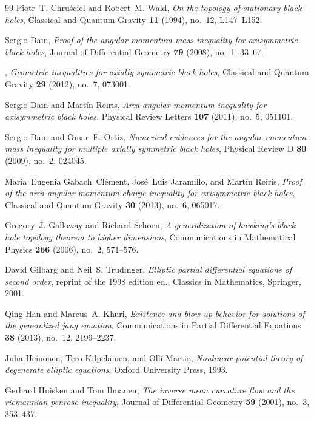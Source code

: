 \begin{thebibliography}{99}
Piotr~T. Chru\'sciel and Robert~M. Wald, \emph{On the topology of stationary black holes}, Classical and Quantum Gravity \textbf{11} (1994), no.~12, L147--L152.

Sergio Dain, \emph{Proof of the angular momentum-mass inequality for
  axisymmetric black holes}, Journal of Differential Geometry \textbf{79}
  (2008), no.~1, 33--67.

\bysame, \emph{Geometric inequalities for axially symmetric black holes},
  Classical and Quantum Gravity \textbf{29} (2012), no.~7, 073001.

Sergio Dain and Mart\'in Reiris, \emph{Area-angular momentum inequality for
  axisymmetric black holes}, Physical Review Letters \textbf{107} (2011),
  no.~5, 051101.

Sergio Dain and Omar~E. Ortiz, \emph{Numerical evidences for the angular momentum-mass inequality for multiple axially symmetric black holes}, Physical Review D \textbf{80} (2009), no.~2, 024045.

Mar\'ia~Eugenia Gabach~Cl\'ement, Jos\'e~Luis Jaramillo, and Mart\'in Reiris,
  \emph{Proof of the area-angular momentum-charge inequality for axisymmetric
  black holes}, Classical and Quantum Gravity \textbf{30} (2013), no.~6,
  065017.

Gregory~J. Galloway and Richard Schoen, \emph{A generalization of hawking's
  black hole topology theorem to higher dimensions}, Communications in
  Mathematical Physics \textbf{266} (2006), no.~2, 571--576.

David Gilbarg and Neil~S. Trudinger, \emph{Elliptic partial differential
  equations of second order}, reprint of the 1998 edition ed., Classics in
  Mathematics, Springer, 2001.

Qing Han and Marcus~A. Khuri, \emph{Existence and blow-up behavior for
  solutions of the generalized jang equation}, Communications in Partial
  Differential Equations \textbf{38} (2013), no.~12, 2199--2237.

Juha Heinonen, Tero Kilpel\"ainen, and Olli Martio, \emph{Nonlinear potential
  theory of degenerate elliptic equations}, Oxford University Press, 1993.

Gerhard Huisken and Tom Ilmanen, \emph{The inverse mean curvature flow and the
  riemannian penrose inequality}, Journal of Differential Geometry \textbf{59}
  (2001), no.~3, 353--437.


\end{thebibliography}
